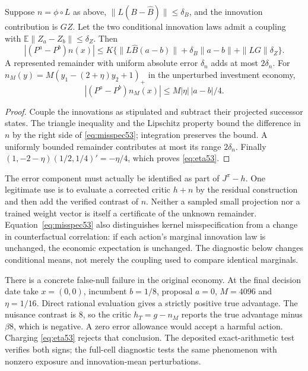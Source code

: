 \begin{proposition}\label{prop:null53}
Suppose $n=\phi\circ L$ as above, $\|L(B-\widehat B)\|\le\delta_B$, and the innovation contribution is $GZ$. Let the two conditional innovation laws admit a coupling with $\mathbb E\|Z_a-Z_b\|\le\delta_Z$. Then
\begin{equation}\label{eq:misspec53}
 |(P^a-P^b)n(x)|\le
 K\{\|L\widehat B(a-b)\|+\delta_B\|a-b\|+\|LG\|\delta_Z\}.
\end{equation}
A represented remainder with uniform absolute error $\delta_n$ adds at most $2\delta_n$. For $n_M(y)=M(y_1-(2+\eta)y_2+1)_+$ in the unperturbed investment economy,
\begin{equation}\label{eq:eta53}
 |(P^a-P^b)n_M(x)|\le M|\eta|\,|a-b|/4.
\end{equation}
\end{proposition}
\begin{proof}
Couple the innovations as stipulated and subtract their projected successor states. The triangle inequality and the Lipschitz property bound the difference in $n$ by the right side of \eqref{eq:misspec53}; integration preserves the bound. A uniformly bounded remainder contributes at most its range $2\delta_n$. Finally $(1,-2-\eta)(1/2,1/4)'=-\eta/4$, which proves \eqref{eq:eta53}.
\end{proof}

The error component must actually be identified as part of $J^\pi-h$. One legitimate use is to evaluate a corrected critic $h+n$ by the residual construction and then add the verified contrast of $n$. Neither a sampled small projection nor a trained weight vector is itself a certificate of the unknown remainder. Equation~\eqref{eq:misspec53} also distinguishes kernel misspecification from a change in counterfactual correlation: if each action's marginal innovation law is unchanged, the economic expectation is unchanged. The diagnostic below changes conditional means, not merely the coupling used to compare identical marginals.

There is a concrete false-null failure in the original economy. At the final decision date take $x=(0,0)$, incumbent $b=1/8$, proposal $a=0$, $M=4096$ and $\eta=1/16$. Direct rational evaluation gives a strictly positive true advantage. The nuisance contrast is $8$, so the critic $h_T=g-n_M$ reports the true advantage minus $\beta8$, which is negative. A zero error allowance would accept a harmful action. Charging \eqref{eq:eta53} rejects that conclusion. The deposited exact-arithmetic test verifies both signs; the full-cell diagnostic tests the same phenomenon with nonzero exposure and innovation-mean perturbations.
